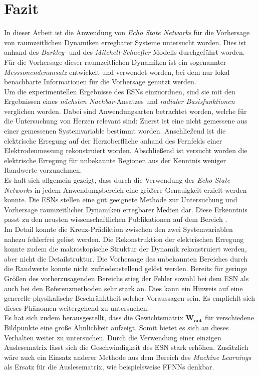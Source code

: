 \chapter{Fazit}
In dieser Arbeit ist die Anwendung von \textit{Echo State Networks} für die Vorhersage von raumzeitlichen Dynamiken erregbarer Systeme untersucht worden. Dies ist anhand des \textit{Barkley}- und des \textit{Mitchell-Schaeffer}-Modells durchgeführt worden. Für die Vorhersage dieser raumzeitlichen Dynamiken ist ein sogenannter \textit{Messsonendenansatz} entwickelt und verwendet worden, bei dem nur lokal benachbarte Informationen für die Vorhersage genutzt werden.\\

Um die experimentellen Ergebnisse des \textsc{ESN}s einzuordnen, sind sie mit den Ergebnissen eines \textit{nächsten Nachbar}-Ansatzes und \textit{radialer Basisfunktionen} verglichen worden. Dabei sind Anwendungsarten betrachtet worden, welche für die Untersuchung von Herzen relevant sind: Zuerst ist eine nicht gemessene aus einer gemessenen Systemvariable bestimmt worden. Anschließend ist die elektrische Erregung auf der Herzoberfläche anhand des Fernfelds einer Elektrodenmessung rekonstruiert worden. Abschließend ist versucht worden die elektrische Erregung für unbekannte Regionen aus der Kenntnis weniger Randwerte vorzunehmen.\\

Es halt sich allgemein gezeigt, dass durch die Verwendung der \textit{Echo State Networks} in jedem Anwendungsbereich eine größere Genauigkeit erzielt werden konnte. Die \textsc{ESN}s stellen eine gut geeignete Methode zur Untersuchung und Vorhersage raumzeitlicher Dynamiken erregbarer Medien dar. Diese Erkenntnis passt zu den neusten wissenschaftlichen Publikationen auf dem Bereich \citep{Lu2017}.\\

Im Detail konnte die Kreuz-Prädiktion zwischen den zwei Systemvariablen nahezu fehlerfrei gelöst werden. Die Rekonstruktion der elektrischen Erregung konnte zudem die makroskopische Struktur der Dynamik rekonstruiert werden, aber nicht die Detailstruktur. Die Vorhersage des unbekannten Bereiches durch die Randwerte konnte nicht zufriedenstellend gelöst werden. Bereits für geringe Größen des vorherzusagenden Bereichs stieg der Fehler sowohl bei dem \textsc{ESN} als auch bei den Referenzmethoden sehr stark an. Dies kann ein Hinweis auf eine generelle physikalische Beschränktheit solcher Voraussagen sein. Es empfiehlt sich dieses Phänomen weitergehend zu untersuchen. \\

Es hat sich zudem herausgestellt, dass die Gewichtsmatrix $\mathbf{W_{out}}$ für verschiedene Bildpunkte eine große Ähnlichkeit aufzeigt. Somit bietet es sich an dieses Verhalten weiter zu untersuchen. Durch die Verwendung einer einzigen Auslesematrix lässt sich die Geschwindigkeit des \textsc{ESN} stark erhöhen. Zusätzlich wäre auch ein Einsatz anderer Methode aus dem Bereich des \textit{Machine Learnings} als Ersatz für die Auslesematrix, wie beispielsweise \textsc{FFNN}s denkbar.  